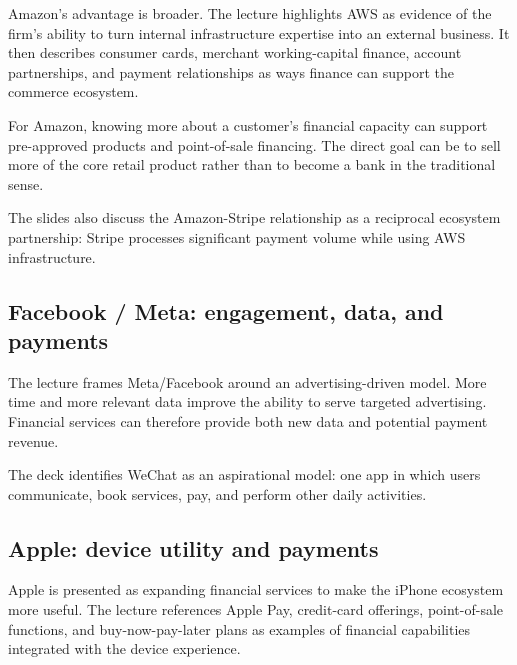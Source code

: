 Amazon's advantage is broader. The lecture highlights AWS as evidence of the firm's ability to turn internal infrastructure expertise into an external business. It then describes consumer cards, merchant working-capital finance, account partnerships, and payment relationships as ways finance can support the commerce ecosystem.

For Amazon, knowing more about a customer's financial capacity can support pre-approved products and point-of-sale financing. The direct goal can be to sell more of the core retail product rather than to become a bank in the traditional sense.

The slides also discuss the Amazon-Stripe relationship as a reciprocal ecosystem partnership: Stripe processes significant payment volume while using AWS infrastructure.

\subsection{Facebook / Meta: engagement, data, and payments}

The lecture frames Meta/Facebook around an advertising-driven model. More time and more relevant data improve the ability to serve targeted advertising. Financial services can therefore provide both new data and potential payment revenue.

The deck identifies WeChat as an aspirational model: one app in which users communicate, book services, pay, and perform other daily activities.

\subsection{Apple: device utility and payments}

Apple is presented as expanding financial services to make the iPhone ecosystem more useful. The lecture references Apple Pay, credit-card offerings, point-of-sale functions, and buy-now-pay-later plans as examples of financial capabilities integrated with the device experience.

